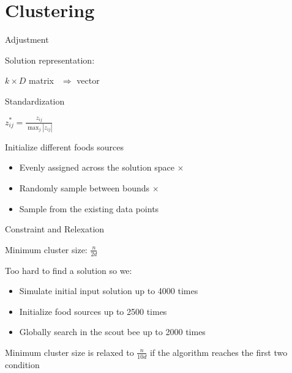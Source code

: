 \documentclass[14pt,ignorenonframetext,compress]{beamer}
\providecommand{\tightlist}{%
  \setlength{\itemsep}{0pt}\setlength{\parskip}{0pt}}
\begin{document}
\hypertarget{clustering}{%
\section{Clustering}\label{clustering}}

\begin{frame}{Adjustment}
\protect\hypertarget{adjustment}{}

\begin{block}{Solution representation:}

\(k\times D\) matrix \pause  \(\ \ \Rightarrow\) vector

\pause

\end{block}

\begin{block}{Standardization}

\(z^*_{ij} = \frac{z_{ij}}{\max_{j}|z_{ij}|}\)

\pause

\end{block}

\begin{block}{Initialize different foods sources}

\begin{itemize}
\tightlist
\item
  Evenly assigned across the solution space \(\times\)
\item
  Randomly sample between bounds \(\times\) \pause
\item
  Sample from the existing data points
\end{itemize}

\end{block}

\end{frame}

\begin{frame}{Constraint and Relexation}
\protect\hypertarget{constraint-and-relexation}{}

Minimum cluster size: \(\frac{n}{2d}\)

Too hard to find a solution so we:

\begin{itemize}
\tightlist
\item
  Simulate initial input solution up to 4000 times
\item
  Initialize food sources up to 2500 times
\item
  Globally search in the scout bee up to 2000 times
\end{itemize}

\pause

Minimum cluster size is relaxed to \(\frac{n}{10d}\) if the algorithm
reaches the first two condition

\end{frame}
\end{document}
